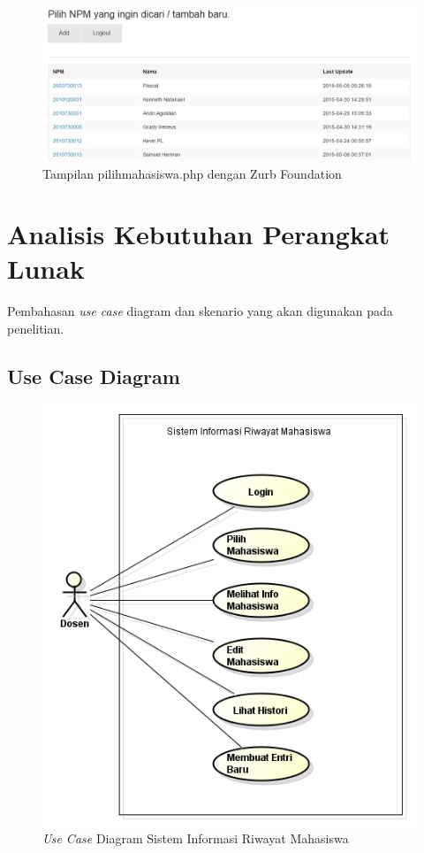 \begin{figure}[pt]
\centering
\includegraphics[scale=0.5]{Gambar/contohzurb.png}
\caption[Tampilan pilihmahasiswa.php dengan Zurb Foundation]{Tampilan
pilihmahasiswa.php dengan Zurb Foundation}
\label{fig:contohzurb}
\end{figure}

\section{Analisis Kebutuhan Perangkat Lunak}
\label{sec:analisiskebutuhanperangkatlunak}

Pembahasan {\it use case} diagram dan skenario yang akan digunakan pada
penelitian.

\subsection{Use Case Diagram}
\begin{figure}[ht]
\centering
\includegraphics[scale=0.8]{Gambar/usecase.png}
\caption[{\it Use Case} Diagram Sistem Informasi Riwayat Mahasiswa]{{\it Use
Case} Diagram Sistem Informasi Riwayat Mahasiswa}
\label{fig:usecase}
\end{figure}

